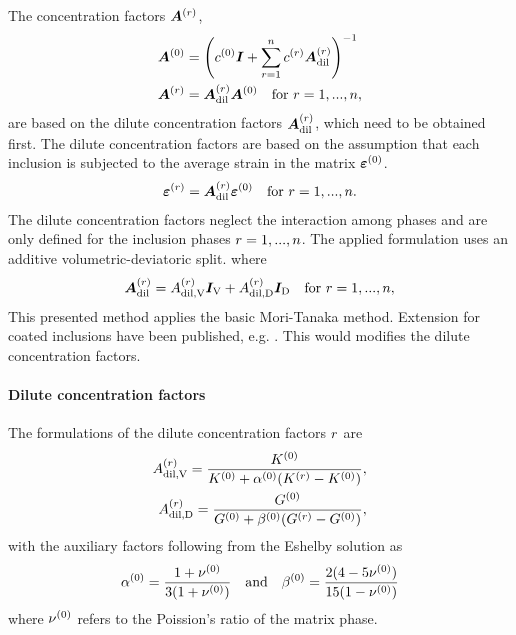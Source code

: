 The concentration factors $\boldsymbol{A}^{(r)}$,
\begin{align}
	\boldsymbol{A}^{(0)} &= \left( c^{(0)}\boldsymbol{I} + \sum^{n}_{r=1} c^{(r)} \boldsymbol{A}_{\text{dil}}^{(r)}\right)^{-1}\label{eq:A0}\\
	\boldsymbol{A}^{(r)} &= \boldsymbol{A}_{\text{dil}}^{(r)}\boldsymbol{A}^{(0)}\quad  \text{for}~ r = 1, ..., n,
\end{align}
are based on the dilute concentration factors $\boldsymbol{A}_{\text{dil}}^{(r)}$, which need to be obtained first.
The dilute concentration factors are based on the assumption that each inclusion is subjected to the average strain in the matrix $\boldsymbol{\varepsilon}^{(0)}$.
\begin{align}
	\boldsymbol{\varepsilon}^{(r)} = \boldsymbol{A}_{\text{dil}}^{(r)}\boldsymbol{\varepsilon}^{(0)} \quad  \text{for}~ r = 1, ..., n. 
\end{align}
The dilute concentration factors neglect the interaction among phases and are only defined for the inclusion phases $r = 1,...,n$.
The applied formulation uses an additive volumetric-deviatoric split. where
\begin{align}
	\boldsymbol{A}_{\text{dil}}^{(r)} = A^{(r)}_{\text{dil,V}}\boldsymbol{I}_{\text{V}} +  A^{(r)}_{\text{dil,D}} \boldsymbol{I}_{\text{D}} \quad  \text{for}~ r = 1, ..., n,
\end{align}
This presented method applies the basic Mori-Tanaka method.
Extension for coated inclusions have been published, e.g. \cite{her_1993_nlib}.
This would modifies the dilute concentration factors. 
\paragraph{Dilute concentration factors}
The formulations of the dilute concentration factors $r$ are
\begin{align}
	A^{(r)}_{\text{dil,V}} = \dfrac{K^{(0)}}{K^{(0)} + \alpha^{(0)}(K^{(r)} - K^{(0)})}, \\
	A^{(r)}_{\text{dil,D}} = \dfrac{G^{(0)}}{G^{(0)} + \beta^{(0)}(G^{(r)} - G^{(0)})}, 
\end{align}
with the auxiliary factors following from the Eshelby solution as
\begin{align}
	\alpha^{(0)} = \frac{1 + \nu^{(0)}}{3(1+ \nu^{(0)})} \quad\text{and}\quad 
	\beta^{(0)} = \frac{2(4 - 5\nu^{(0)})}{15(1 - \nu^{(0)})}
\end{align}
where  $\nu^{(0)}$ refers to the Poission's ratio of the matrix phase.
